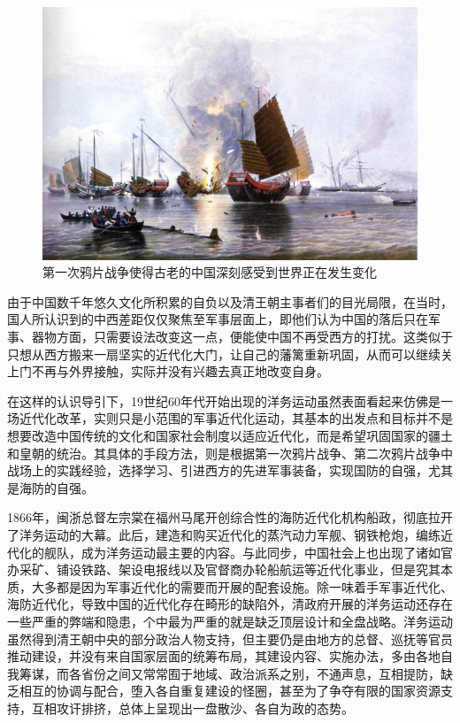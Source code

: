 \documentclass[12pt,UTF8]{ctexbook}
\begin{document}
\begin{figure}[htbp]
	\centering
	\includegraphics[width=0.7\linewidth]{1}
	\caption{第一次鸦片战争使得古老的中国深刻感受到世界正在发生变化}
	\label{fig:1}
\end{figure}

由于中国数千年悠久文化所积累的自负以及清王朝主事者们的目光局限，在当时，国人所认识到的中西差距仅仅聚焦至军事层面上，即他们认为中国的落后只在军事、器物方面，只需要设法改变这一点，便能使中国不再受西方的打扰。这类似于只想从西方搬来一扇坚实的近代化大门，让自己的藩篱重新巩固，从而可以继续关上门不再与外界接触，实际并没有兴趣去真正地改变自身。

在这样的认识导引下，19世纪60年代开始出现的洋务运动虽然表面看起来仿佛是一场近代化改革，实则只是小范围的军事近代化运动，其基本的出发点和目标并不是想要改造中国传统的文化和国家社会制度以适应近代化，而是希望巩固国家的疆土和皇朝的统治。其具体的手段方法，则是根据第一次鸦片战争、第二次鸦片战争中战场上的实践经验，选择学习、引进西方的先进军事装备，实现国防的自强，尤其是海防的自强。

1866年，闽浙总督左宗棠在福州马尾开创综合性的海防近代化机构船政，彻底拉开了洋务运动的大幕。此后，建造和购买近代化的蒸汽动力军舰、钢铁枪炮，编练近代化的舰队，成为洋务运动最主要的内容。与此同步，中国社会上也出现了诸如官办采矿、铺设铁路、架设电报线以及官督商办轮船航运等近代化事业，但是究其本质，大多都是因为军事近代化的需要而开展的配套设施。除一味着手军事近代化、海防近代化，导致中国的近代化存在畸形的缺陷外，清政府开展的洋务运动还存在一些严重的弊端和隐患，个中最为严重的就是缺乏顶层设计和全盘战略。洋务运动虽然得到清王朝中央的部分政治人物支持，但主要仍是由地方的总督、巡抚等官员推动建设，并没有来自国家层面的统筹布局，其建设内容、实施办法，多由各地自我筹谋，而各省份之间又常常囿于地域、政治派系之别，不通声息，互相提防，缺乏相互的协调与配合，堕入各自重复建设的怪圈，甚至为了争夺有限的国家资源支持，互相攻讦排挤，总体上呈现出一盘散沙、各自为政的态势。
\end{document}
